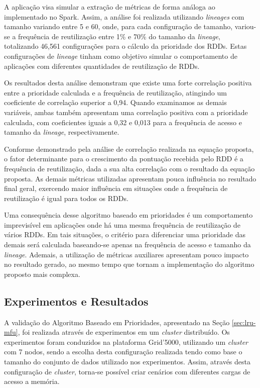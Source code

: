 A aplicação visa simular a extração de métricas de forma análoga ao implementado no Spark. Assim, a análise foi realizada utilizando \textit{lineages} com tamanho variando entre 5 e 60, onde, para cada configuração de tamanho, variou-se a frequência de reutilização entre 1\% e 70\% do tamanho da \textit{lineage}, totalizando 46,561 configurações para o cálculo da prioridade dos RDDs. Estas configurações de \textit{lineage} tinham como objetivo simular o comportamento de aplicações com diferentes quantidades de reutilização de RDDs.

Os resultados desta análise demonstram que existe uma forte correlação positiva entre a prioridade calculada e a frequência de reutilização, atingindo um coeficiente de correlação superior a 0,94. Quando examinamos as demais variáveis, ambas também apresentam uma correlação positiva com a prioridade calculada, com coeficientes iguais a 0,32 e 0,013 para a frequência de acesso e tamanho da \textit{lineage}, respectivamente. 

Conforme demonstrado pela análise de correlação realizada na equação proposta, o fator determinante para o crescimento da pontuação recebida pelo RDD é a frequência de reutilização, dada a sua alta correlação com o resultado da equação proposta. As demais métricas utilizadas apresentam pouca influência no resultado final geral, exercendo maior influência em situações onde a frequência de reutilização é igual para todos os RDDs.

Uma consequência desse algoritmo baseado em prioridades é um comportamento imprevisível em aplicações onde há uma mesma frequência de reutilização de vários RDDs. Em tais situações, o critério para diferenciar uma prioridade das demais será calculada baseando-se apenas na frequência de acesso e tamanho da \textit{lineage}. Ademais, a utilização de métricas auxiliares apresentam pouco impacto no resultado gerado, ao mesmo tempo que tornam a implementação do algoritmo proposto mais complexa.

\subsection{Experimentos e Resultados}
A validação do Algoritmo Baseado em Prioridades, apresentado na Seção \ref{sec:lru-mfu}, foi realizada através de experimentos em um \textit{cluster} distribuído. Os experimentos foram conduzidos na plataforma Grid'5000, utilizando um \textit{cluster} com 7 nodos, sendo a escolha desta configuração realizada tendo como base o tamanho do conjunto de dados utilizado nos experimentos. Assim, através desta configuração de \textit{cluster}, torna-se possível criar cenários com diferentes cargas de acesso a memória.

